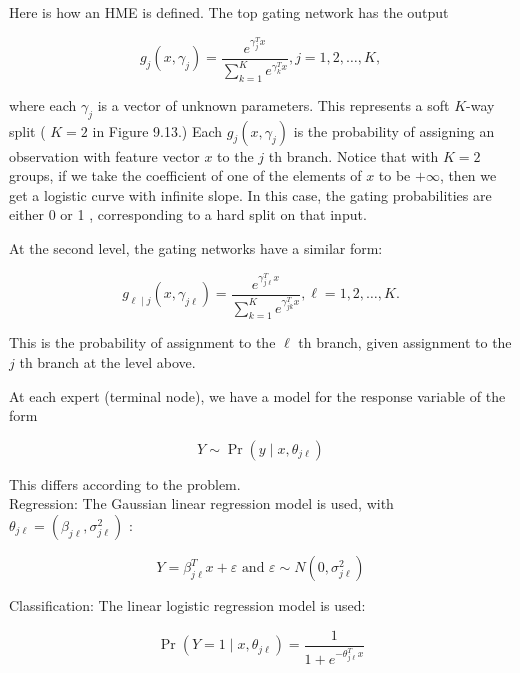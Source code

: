 \documentclass[10pt]{article}
\begin{document}
Here is how an HME is defined. The top gating network has the output


\begin{equation*}
g_{j}\left(x, \gamma_{j}\right)=\frac{e^{\gamma_{j}^{T} x}}{\sum_{k=1}^{K} e^{\gamma_{k}^{T} x}}, j=1,2, \ldots, K, \tag{9.25}
\end{equation*}


where each $\gamma_{j}$ is a vector of unknown parameters. This represents a soft $K$-way split ( $K=2$ in Figure 9.13.) Each $g_{j}\left(x, \gamma_{j}\right)$ is the probability of assigning an observation with feature vector $x$ to the $j$ th branch. Notice that with $K=2$ groups, if we take the coefficient of one of the elements of $x$ to be $+\infty$, then we get a logistic curve with infinite slope. In this case, the gating probabilities are either 0 or 1 , corresponding to a hard split on that input.

At the second level, the gating networks have a similar form:


\begin{equation*}
g_{\ell \mid j}\left(x, \gamma_{j \ell}\right)=\frac{e^{\gamma_{j \ell}^{T} x}}{\sum_{k=1}^{K} e^{\gamma_{j k}^{T} x}}, \ell=1,2, \ldots, K . \tag{9.26}
\end{equation*}


This is the probability of assignment to the $\ell$ th branch, given assignment to the $j$ th branch at the level above.

At each expert (terminal node), we have a model for the response variable of the form


\begin{equation*}
Y \sim \operatorname{Pr}\left(y \mid x, \theta_{j \ell}\right) \tag{9.27}
\end{equation*}


This differs according to the problem.\\
Regression: The Gaussian linear regression model is used, with $\theta_{j \ell}= \left(\beta_{j \ell}, \sigma_{j \ell}^{2}\right)$ :


\begin{equation*}
Y=\beta_{j \ell}^{T} x+\varepsilon \text { and } \varepsilon \sim N\left(0, \sigma_{j \ell}^{2}\right) \tag{9.28}
\end{equation*}


Classification: The linear logistic regression model is used:


\begin{equation*}
\operatorname{Pr}\left(Y=1 \mid x, \theta_{j \ell}\right)=\frac{1}{1+e^{-\theta_{j \ell}^{T} x}} \tag{9.29}
\end{equation*}
\end{document}
